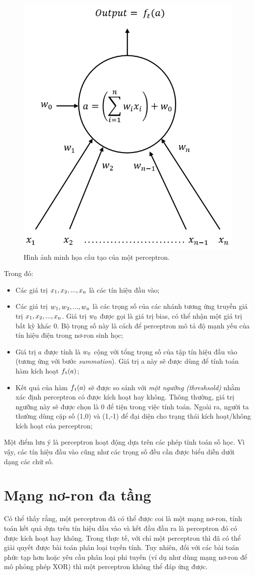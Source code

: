 \begin{figure}[!h]
	\centering
		\includegraphics[width=0.4\columnwidth]{books/artificial-neural-network/chapter01/figure/Picture2.png}
		\centering
	\caption{Hình ảnh minh họa cấu tạo của một perceptron.}
	\label{fig:structureOfPerceptron}
\end{figure}

\noindent Trong đó:
\begin{itemize}
    \item Các giá trị $x_{1},x\textsubscript{2},...,x\textsubscript{n}$ là các tín hiệu đầu vào;
    \item Các giá trị $w\textsubscript{1},w\textsubscript{2},...,w\textsubscript{n}$ là các trọng số của các nhánh tương ứng truyền giá trị $x\textsubscript{1},x\textsubscript{2},...,x\textsubscript{n}$. Giá trị $w\textsubscript{0}$ được gọi là giá trị bias, có thể nhận một giá trị bất kỳ khác 0. Bộ trọng số này là cách để perceptron mô tả độ mạnh yếu của tín hiệu điện trong nơ-ron sinh học;
    \item Giá trị $a$ được tính là $w\textsubscript{0}$ cộng với tổng trọng số của tập tín hiệu đầu vào (tương ứng với bước \textit{summation}). Giá trị a này sẽ được dùng để tính toán hàm kích hoạt $f\textsubscript{t}(a)$;
    \item Kết quả của hàm $f\textsubscript{t}(a)$ sẽ được so sánh với \textit{một ngưỡng (threshsold)} nhằm xác định perceptron có được kích hoạt hay không. Thông thường, giá trị ngưỡng này sẽ được chọn là 0 để tiện trong việc tính toán. Ngoài ra, người ta thường dùng cặp số (1,0) và (1,-1) để đại diện cho trạng thái kích hoạt/không kích hoạt của perceptron;
\end{itemize}
Một điểm lưu ý là perceptron hoạt động dựa trên các phép tính toán số học. Vì vậy, các tín hiệu đầu vào cũng như các trọng số đều cần được biểu diễn dưới dạng các chữ số.

\section{Mạng nơ-ron đa tầng}
\label{sec:MLP}
Có thể thấy rằng, một perceptron đã có thể được coi là một mạng nơ-ron, tính toán kết quả dựa trên tín hiệu đầu vào và kết đầu đầu ra là perceptron đó có được kích hoạt hay không. Trong thực tế, với chỉ một perceptron thì đã có thể giải quyết được bài toán phân loại tuyến tính. Tuy nhiên, đối với các bài toán phức tạp hơn hoặc yêu cầu phân loại phi tuyến (ví dụ như dùng mạng nơ-ron để mô phỏng phép XOR) thì một perceptron không thể đáp ứng được.
